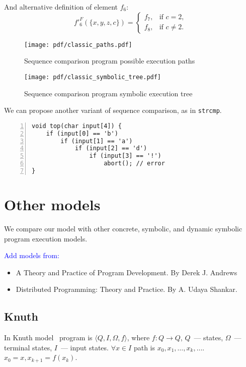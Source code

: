 \documentclass[fleqn,oneside,a4]{article}
\newcommand{\level}{\section}
\newcommand{\sublevel}{\subsection}
\newcommand{\comment}[1]{\textcolor{blue}{#1}}  %
\newcommand{\ra}{\rightarrow}
\begin{document}
And alternative definition of element $f_6$:
\[ f'_6^F(\{x, y, z, c\}) =
    \begin{cases}
        f_7, & \text{if }c = 2, \\
        f_8, & \text{if }c \neq 2.
    \end{cases} \]

\begin{figure}[h!]
    \begin{center}
        \texttt{[image: pdf/classic\_paths.pdf]}
    \end{center}
    \caption{Sequence comparison program possible execution paths}
\end{figure}

\begin{figure}[h!]
    \begin{center}
        \texttt{[image: pdf/classic\_symbolic\_tree.pdf]}
    \end{center}
    \caption{Sequence comparison program symbolic execution tree}
\end{figure}

We can propose another variant of sequence comparison, as in \texttt{strcmp}.
\begin{lstlisting}[numbers=left,numberstyle=\scriptsize]
void top(char input[4]) {
    if (input[0] == 'b')
        if (input[1] == 'a')
            if (input[2] == 'd')
                if (input[3] == '!')
                    abort(); // error
}
\end{lstlisting}

\level{Other models}

We compare our model with other concrete, symbolic, and dynamic symbolic
program execution models.

 \comment{Add models from:}
\begin{itemize}
    \item A Theory and Practice of Program Development.
        By Derek J. Andrews
    \item Distributed Programming: Theory and Practice.
        By A. Udaya Shankar.
\end{itemize}

\sublevel{Knuth}

In Knuth model~\cite{knuth} program is $\langle Q, I, \Omega, f \rangle$,
where $f: Q \ra Q$, $Q$~--- states, $\Omega$~--- terminal states,
$I$~--- input states.
$\forall x \in I$ path is $x_0, x_1, \dots, x_k, \dots$.
$x_0 = x, x_{k + 1} = f(x_k)$.
\end{document}

